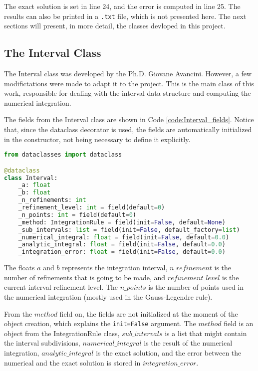 The exact solution is set in line 24, and the error is computed in line 25. The results can also be printed in a \texttt{.txt} file, which is not presented here. The next sections will present, in more detail, the classes devloped in this project.

\subsection{The Interval Class}
The Interval class was developed by the Ph.D. Giovane Avancini. However, a few modifictations were made to adapt it to the project. This is the main class of this work, responsible for dealing with the interval data structure and computing the numerical integration.

The fields from the Interval class are shown in Code \ref{code:Interval_fields}. Notice that, since the dataclass decorator is used, the fields are automatically initialized in the constructor, not being necessary to define it explicitly.
\begin{lstlisting}[language=python, caption={Interval class fields.}, label={code:Interval_fields}]
from dataclasses import dataclass

@dataclass
class Interval:
    _a: float
    _b: float
    _n_refinements: int
    _refinement_level: int = field(default=0)
    _n_points: int = field(default=0)
    _method: IntegrationRule = field(init=False, default=None)
    _sub_intervals: list = field(init=False, default_factory=list)
    _numerical_integral: float = field(init=False, default=0.0)
    _analytic_integral: float = field(init=False, default=0.0)
    _integration_error: float = field(init=False, default=0.0)
\end{lstlisting}

The floats $a$ and $b$ represents the integration interval, $n\_refinement$ is the number of refinements that is going to be made, and ${refinement\_level}$ is the current interval refinement level. The $n\_points$ is the number of points used in the numerical integration (mostly used in the Gauss-Legendre rule). 

From the $method$ field on, the fields are not initialized at the moment of the object creation, which explains the \texttt{init=False} argument. The $method$ field is an object from the IntegrationRule class, $sub\_intervals$ is a list that might contain the interval subdivisions, $numerical\_integral$ is the result of the numerical integration, $analytic\_integral$ is the exact solution, and the error between the numerical and the exact solution is stored in $integration\_error$.


